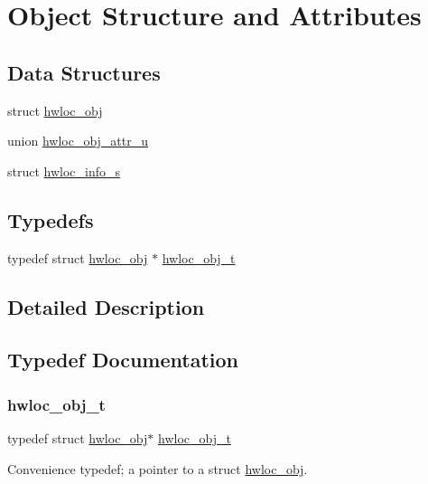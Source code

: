 \hypertarget{a00185}{}\section{Object Structure and Attributes}
\label{a00185}
\subsection*{Data Structures}
\begin{DoxyCompactItemize}
\item 
struct \hyperlink{a00238}{hwloc\+\_\+obj}
\item 
union \hyperlink{a00242}{hwloc\+\_\+obj\+\_\+attr\+\_\+u}
\item 
struct \hyperlink{a00286}{hwloc\+\_\+info\+\_\+s}
\end{DoxyCompactItemize}
\subsection*{Typedefs}
\begin{DoxyCompactItemize}
\item 
typedef struct \hyperlink{a00238}{hwloc\+\_\+obj} $\ast$ \hyperlink{a00185_ga79b8ab56877ef99ac59b833203391c7d}{hwloc\+\_\+obj\+\_\+t}
\end{DoxyCompactItemize}


\subsection{Detailed Description}


\subsection{Typedef Documentation}
\mbox{\label{a00185_ga79b8ab56877ef99ac59b833203391c7d}} 
\subsubsection{\texorpdfstring{hwloc\+\_\+obj\+\_\+t}{hwloc\_obj\_t}}
{\footnotesize\ttfamily typedef struct \hyperlink{a00238}{hwloc\+\_\+obj}$\ast$ \hyperlink{a00185_ga79b8ab56877ef99ac59b833203391c7d}{hwloc\+\_\+obj\+\_\+t}}



Convenience typedef; a pointer to a struct \hyperlink{a00238}{hwloc\+\_\+obj}. 

